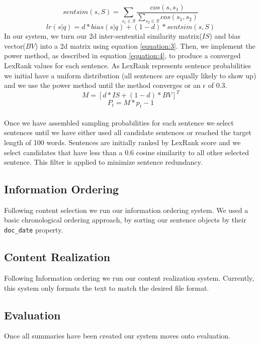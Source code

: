 \documentclass[11pt,a4paper]{article}
\begin{document}
\begin{equation}
    sentsim(s,S) = \sum_{s_1 \in S} \frac{cos(s,s_1)}{\sum_{s_2 \in S} cos(s_1,s_2) }
\end{equation}
\begin{equation}
\label{equation:2}
lr(s|q) = d * bias(s|q) + (1-d) * sentsim(s,S)
\end{equation}
In our system, we turn our 2d inter-sentential similarity matrix($IS$) and bias vector($BV$) into a 2d matrix using equation \ref{equation:3}.  Then, we implement the power method, as described in equation \ref{equation:4}, to produce a converged LexRank values for each sentence. As LexRank represents sentence probabilities we initial have a uniform distribution (all sentences are equally likely to show up) and we use the power method until the method converges or an $\epsilon$ of 0.3.
\begin{equation}
\label{equation:3}
M = [d * IS + (1-d) * BV]^T
\end{equation}
\begin{equation}
\label{equation:4}
P_t = M * p_t-1
\end{equation} \\
Once we have assembled sampling probabilities for each sentence we select sentences until we have either used all candidate sentences or reached the target length of 100 words. Sentences are initially ranked by LexRank score and we select candidates that have less than a 0.6 cosine similarity to all other selected sentence. This filter is applied to minimize sentence redundancy. 
\subsection{Information Ordering}
Following content selection we run our information ordering system. We used a basic chronological ordering approach, by sorting our sentence objects by their \texttt{doc\_date} property.\\
\subsection{Content Realization}
Following Information ordering we run our content realization system. Currently, this system only formats the text to match the desired file format.
\subsection{Evaluation}
Once all summaries have been created our system moves onto evaluation. 
\end{document}
